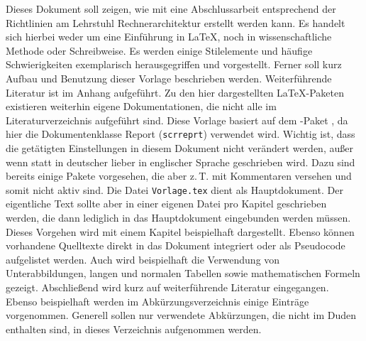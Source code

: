 Dieses Dokument soll zeigen, wie mit \LaTeXe{} eine Abschlussarbeit entsprechend
der Richtlinien am Lehrstuhl Rechnerarchitektur erstellt werden kann. Es handelt
sich hierbei weder um eine Einführung in \LaTeX, noch in wissenschaftliche
Methode oder Schreibweise. Es werden einige Stilelemente und häufige
Schwierigkeiten exemplarisch herausgegriffen und vorgestellt. Ferner soll kurz
Aufbau und Benutzung dieser Vorlage beschrieben werden. Weiterführende Literatur
ist im Anhang aufgeführt. Zu den hier dargestellten \LaTeX-Paketen existieren
weiterhin eigene Dokumentationen, die nicht alle im Literaturverzeichnis
aufgeführt sind. Diese Vorlage basiert auf dem \KOMAScript-Paket
\cite{Neukam2003}, da hier die Dokumentenklasse Report (\verb!scrreprt!)
verwendet wird. Wichtig ist, dass die getätigten Einstellungen in diesem
Dokument nicht verändert werden, außer wenn statt in deutscher lieber in
englischer Sprache geschrieben wird. Dazu sind bereits einige Pakete vorgesehen,
die aber z.\,T. mit Kommentaren versehen und somit nicht aktiv sind. Die Datei
\verb!Vorlage.tex! dient als Hauptdokument. Der eigentliche Text sollte aber in
einer eigenen Datei pro Kapitel geschrieben werden, die dann lediglich in das
Hauptdokument eingebunden werden müssen. Dieses Vorgehen wird mit einem Kapitel
beispielhaft dargestellt. Ebenso können vorhandene Quelltexte direkt in das
Dokument integriert oder als Pseudocode aufgelistet werden. Auch wird
beispielhaft die Verwendung von Unterabbildungen, langen und normalen Tabellen
sowie mathematischen Formeln gezeigt. Abschließend wird kurz auf weiterführende
Literatur eingegangen. Ebenso beispielhaft werden im Abkürzungsverzeichnis
einige Einträge vorgenommen. Generell sollen nur verwendete Abkürzungen, die
nicht im Duden enthalten sind, in dieses Verzeichnis aufgenommen werden.